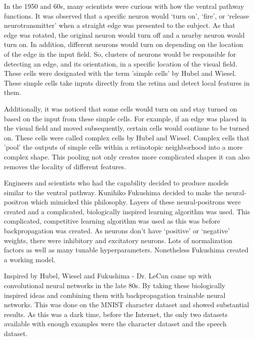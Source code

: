 In the 1950 and 60s, many scientists were curious with how the ventral pathway functions. 
It was observed that a specific neuron would `turn on', `fire', or `release neurotransmitter' when a straight edge was 
presented to the subject.
As that edge was rotated, the original neuron would turn off and a nearby neuron would turn on.
In addition, different neurons would turn on depending on the location of the edge in the input field.
So, clusters of neurons would be responsible for detecting an edge, and its orientation, in a specific location of the visual field.
These cells were designated with the term 'simple cells' by Hubel and Wiesel.
These simple cells take inputs directly from the retina and detect local features in them.

Additionally, it was noticed that some cells would turn on and stay turned on based on the input from these simple cells.
For example, if an edge was placed in the visual field and moved subsequently, certain cells would continue to be turned on.
These cells were called complex cells by Hubel and Wiesel.
Complex cells that 'pool' the outputs of simple cells within a retinotopic neighborhood into a more complex shape.
This pooling not only creates more complicated shapes it can also removes the locality of different features.

Engineers and scientists who had the capability decided to produce models similar to the ventral pathway.
Kunihiko Fukushima decided to make the neural-positron which mimicked this philosophy.
Layers of these neural-positrons were created and a complicated, biologically inspired learning algorithm was used.
This complicated, competitive learning algorithm was used as this was before backpropagation was created.
As neurons don't have `positive' or `negative' weights, there were inhibitory and excitatory neurons.
Lots of normalization factors as well as many tunable hyperparameters.
Nonetheless Fukushima created a working model.

Inspired by Hubel, Wiesel and Fukushima - Dr. LeCun came up with convolutional neural networks in the late 80s.
By taking these biologically inspired ideas and combining them with backpropagation trainable neural networks.
This was done on the MNIST character dataset and showed substantial results.
As this was a dark time, before the Internet, the only two datasets available with enough examples were the character dataset and 
the speech dataset.

